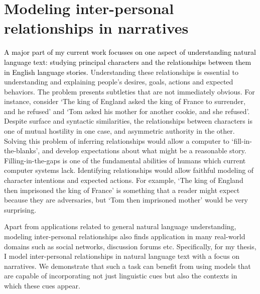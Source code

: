 \documentclass[9.8pt, twocolumn]{article}
\begin{document}
\section{Modeling inter-personal relationships in narratives}
\textcolor{black}{A major part of my current work focusses on one aspect of understanding natural language text: studying principal characters and the relationships between them in English language stories.}
Understanding these relationships is essential to understanding and explaining people's desires, goals, actions and expected behaviors. The problem presents subtleties that are not immediately obvious. For instance, consider `The king of England asked the king of France to surrender, and he refused' and `Tom asked his mother for another cookie, and she refused'. %
Despite surface and syntactic similarities, the relationships between characters is one of mutual hostility in one case, and asymmetric authority in the other.
Solving this problem of inferring relationships would allow a computer to `fill-in-the-blanks', and develop expectations about what might be a reasonable story. %
Filling-in-the-gaps is one of the fundamental abilities of humans which current computer systems lack. Identifying relationships would allow faithful modeling of character intentions and expected actions. For example, `The king of England then imprisoned the king of France' is something that a reader might expect because they are adversaries, but `Tom then imprisoned mother' would be very surprising. %

Apart from applications related to general natural language understanding, modeling inter-personal relationships also finds application in many real-world domains such as social networks, discussion forums etc. Specifically, for my thesis, I model inter-personal relationships in natural language text with a focus on narratives. We demonstrate that such a task can benefit from using models that are capable of incorporating not just linguistic cues but also the contexts in which these cues appear. 
\end{document}
